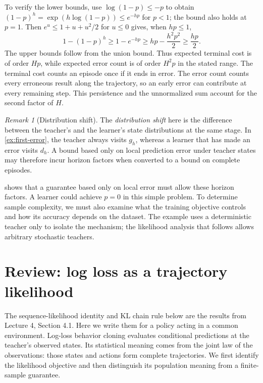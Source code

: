 \documentclass[11pt,twoside]{article}
\theoremstyle{definition}
\theoremstyle{remark}
\newtheorem{remark}[theorem]{Remark}
\begin{document}
To verify the lower bounds, use $\log(1-p)\le-p$ to obtain
$(1-p)^h=\exp(h\log(1-p))\le e^{-hp}$ for $p<1$; the bound also holds
at $p=1$. Then $e^u\le1+u+u^2/2$ for $u\le0$ gives, when $hp\le1$,
\[
 1-(1-p)^h
 \ge1-e^{-hp}
 \ge hp-\frac{h^2p^2}{2}
 \ge\frac{hp}{2}.
\]
The upper bounds follow from the union bound. Thus expected terminal cost
is of order $Hp$, while expected error count is of order $H^2p$ in the
stated range. The terminal cost counts an episode once if it ends in error.
The error count counts every erroneous result along the trajectory, so an early
error can contribute at every remaining step. This persistence and the
unnormalized sum account for the second factor of $H$.

\begin{remark}[Distribution shift]
\label{rem:compounding}
The \emph{distribution shift} here is the difference between the teacher's
and the learner's state distributions at the same stage. In
\cref{ex:first-error}, the teacher always visits $g_h$, whereas a learner
that has made an error visits $d_h$. A bound based only on local
prediction error under teacher states may therefore incur horizon factors
when converted to a bound on complete episodes.
\end{remark}

 shows that a guarantee based only on local error must
allow these horizon factors. A learner could achieve $p=0$ in this simple problem.
To determine sample complexity, we must also examine what the training
objective controls and how its accuracy depends on the dataset.
The example uses a deterministic teacher only to isolate the mechanism;
the likelihood analysis that follows allows arbitrary stochastic teachers.

\section{Review: log loss as a trajectory likelihood}
\label{sec:likelihood}

The sequence-likelihood identity and KL chain rule below are the results
from Lecture 4, Section 4.1. Here we write them for a policy acting in a
common environment. Log-loss behavior cloning evaluates conditional
predictions at the teacher's
observed states. Its statistical meaning comes from the joint law of the
observations: those states and actions form complete trajectories.
We first identify the likelihood objective and then distinguish its population
meaning from a finite-sample guarantee.
\end{document}
